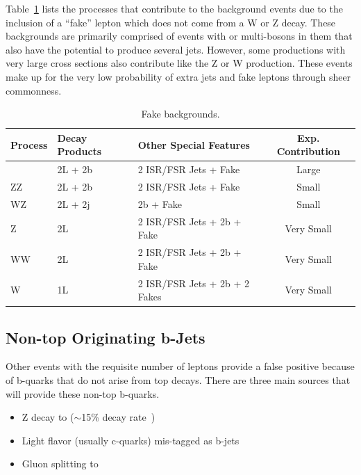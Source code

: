 	


	Table~\ref{tab:fake_bkg} lists the processes that contribute to the background events due to the inclusion of a ``fake'' lepton which does not come from a W or Z decay. These backgrounds are primarily comprised of events with \ttbar or multi-bosons in them that also have the potential to produce several jets. However, some productions with very large cross sections also contribute like the Z or W production. These events make up for the very low probability of extra jets and fake leptons through sheer commonness.
			
	\begin{table}[hbt]
	\caption{\label{tab:fake_bkg} Fake backgrounds.}
	\begin{center}
	\begin{tabular}{l|ll|c}\hline\hline %
	Process & Decay Products & Other Special Features & Exp. Contribution\\
	\hline
	\ttbar & 2L + 2b & 2 ISR/FSR Jets + Fake & Large\\
	ZZ & 2L + 2b & 2 ISR/FSR Jets + Fake & Small\\
	WZ & 2L + 2j & 2b + Fake & Small\\
	Z & 2L & 2 ISR/FSR Jets + 2b + Fake & Very Small\\
	WW & 2L & 2 ISR/FSR Jets + 2b + Fake & Very Small\\
	W & 1L & 2 ISR/FSR Jets + 2b + 2 Fakes & Very Small\\
	\hline \hline
	\end{tabular}
	
	\end{center}
	\end{table}



\subsection{Non-top Originating b-Jets}
Other events with the requisite number of leptons provide a false positive because of b-quarks that do not arise from top decays. There are three main sources that will provide these non-top b-quarks.
\begin{itemize}
\item Z decay to \bbbar ($\sim$15\% decay rate~\cite{pdg})
\item Light flavor (usually c-quarks) mis-tagged as b-jets
\item Gluon splitting to \bbbar
\end{itemize}

